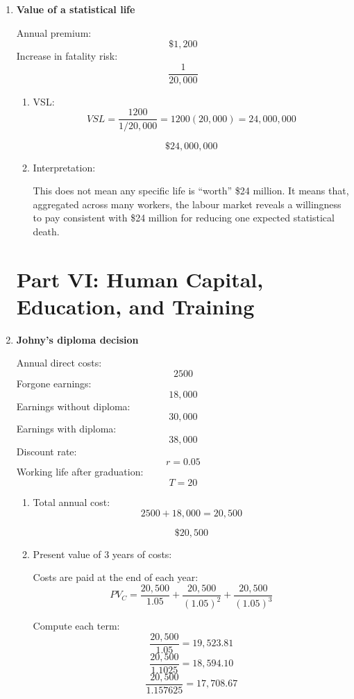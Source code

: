 \documentclass[12pt]{article}
\begin{document}
\begin{enumerate}

\item \textbf{Value of a statistical life}

Annual premium:
\[
\$1{,}200
\]
Increase in fatality risk:
\[
\frac{1}{20{,}000}
\]

\begin{enumerate}[label=(\alph*)]
    \item VSL:
    \[
    VSL=\frac{1200}{1/20{,}000}=1200(20{,}000)=24{,}000{,}000
    \]

    \[
    \boxed{\$24{,}000{,}000}
    \]

    \item Interpretation:

    This does not mean any specific life is ``worth'' \$24 million. It means that, aggregated across many workers, the labour market reveals a willingness to pay consistent with \$24 million for reducing one expected statistical death.
\end{enumerate}

\section*{Part VI: Human Capital, Education, and Training}

\item \textbf{Johny's diploma decision}

Annual direct costs:
\[
2500
\]
Forgone earnings:
\[
18{,}000
\]
Earnings without diploma:
\[
30{,}000
\]
Earnings with diploma:
\[
38{,}000
\]
Discount rate:
\[
r=0.05
\]
Working life after graduation:
\[
T=20
\]

\begin{enumerate}[label=(\alph*)]
    \item Total annual cost:
    \[
    2500+18{,}000=20{,}500
    \]

    \[
    \boxed{\$20{,}500}
    \]

    \item Present value of 3 years of costs:

    Costs are paid at the end of each year:
    \[
    PV_C=\frac{20{,}500}{1.05}+\frac{20{,}500}{(1.05)^2}+\frac{20{,}500}{(1.05)^3}
    \]

    Compute each term:
    \[
    \frac{20{,}500}{1.05}=19{,}523.81
    \]
    \[
    \frac{20{,}500}{1.1025}=18{,}594.10
    \]
    \[
    \frac{20{,}500}{1.157625}=17{,}708.67
    \]


\end{enumerate}
\end{enumerate}
\end{document}
